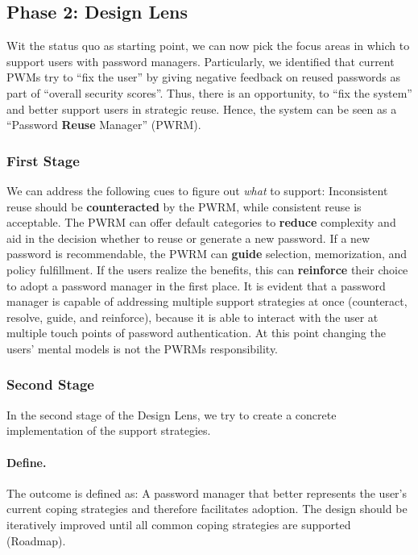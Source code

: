 \subsection{Phase 2: Design Lens}
Wit the status quo as starting point, we can now pick the focus areas in which to support users with password managers. Particularly, we identified that current PWMs try to ``fix the user'' by giving negative feedback on reused passwords as part of ``overall security scores''. Thus, there is an opportunity, to ``fix the system'' and better support users in strategic reuse. Hence, the system can be seen as a ``Password \textbf{Reuse} Manager'' (PWRM). 

\subsubsection{First Stage}
We can address the following cues to figure out \textit{what} to support: Inconsistent reuse should be \textbf{counteracted} by the PWRM, while consistent reuse is acceptable. The PWRM can offer default categories to \textbf{reduce} complexity and aid in the decision whether to reuse or generate a new password. If a new password is recommendable, the PWRM can \textbf{guide} selection, memorization, and policy fulfillment. If the users realize the benefits, this can \textbf{reinforce} their choice to adopt a password manager in the first place. It is evident that a password manager is capable of addressing multiple support strategies at once (counteract, resolve, guide, and reinforce), because it is able to interact with the user at multiple touch points of password authentication. At this point changing the users' mental models is not the PWRMs responsibility. 

\subsubsection{Second Stage}
In the second stage of the Design Lens, we try to create a concrete implementation of the support strategies. 
\paragraph{Define.} The outcome is defined as: A password manager that better represents the user's current coping strategies and therefore facilitates adoption. The design should be iteratively improved until all common coping strategies are supported (Roadmap). 

